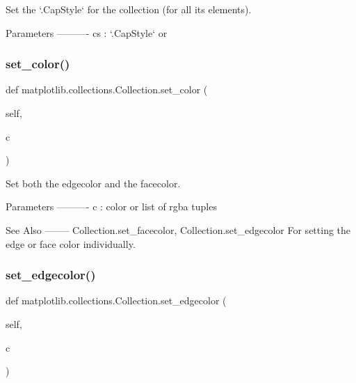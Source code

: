 \begin{DoxyVerb}Set the `.CapStyle` for the collection (for all its elements).

Parameters
----------
cs : `.CapStyle` or %
\end{DoxyVerb}
 \mbox{\label{classmatplotlib_1_1collections_1_1Collection_a07f68643c8a7d9041d17f9325c5c7f97}} 
\subsubsection{\texorpdfstring{set\+\_\+color()}{set\_color()}}
{\footnotesize\ttfamily def matplotlib.\+collections.\+Collection.\+set\+\_\+color (\begin{DoxyParamCaption}\item[{}]{self,  }\item[{}]{c }\end{DoxyParamCaption})}

\begin{DoxyVerb}Set both the edgecolor and the facecolor.

Parameters
----------
c : color or list of rgba tuples

See Also
--------
Collection.set_facecolor, Collection.set_edgecolor
    For setting the edge or face color individually.
\end{DoxyVerb}
 \mbox{\label{classmatplotlib_1_1collections_1_1Collection_a323d180ec29ecd4878b0502cb7f8c9d0}} 
\subsubsection{\texorpdfstring{set\+\_\+edgecolor()}{set\_edgecolor()}}
{\footnotesize\ttfamily def matplotlib.\+collections.\+Collection.\+set\+\_\+edgecolor (\begin{DoxyParamCaption}\item[{}]{self,  }\item[{}]{c }\end{DoxyParamCaption})}

